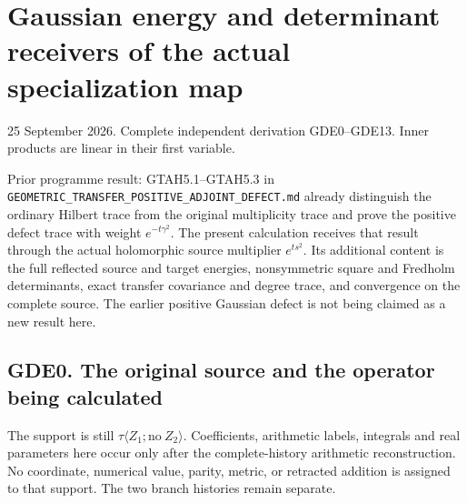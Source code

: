 \section{Gaussian energy and determinant receivers of the actual
specialization
map}\label{gaussian-energy-and-determinant-receivers-of-the-actual-specialization-map}

25 September 2026. Complete independent derivation GDE0--GDE13. Inner
products are linear in their first variable.

Prior programme result: GTAH5.1--GTAH5.3 in
\nolinkurl{GEOMETRIC_TRANSFER_POSITIVE_ADJOINT_DEFECT.md} already
distinguish the ordinary Hilbert trace from the original multiplicity
trace and prove the positive defect trace with weight
\(e^{-t\gamma^2}\). The present calculation receives that result through
the actual holomorphic source multiplier \(e^{ts^2}\). Its additional
content is the full reflected source and target energies, nonsymmetric
square and Fredholm determinants, exact transfer covariance and degree
trace, and convergence on the complete source. The earlier positive
Gaussian defect is not being claimed as a new result here.

\subsection{GDE0. The original source and the operator being
calculated}\label{gde0.-the-original-source-and-the-operator-being-calculated}

The support is still \(\tau\langle Z_1;\mathrm{no}\ Z_2\rangle\).
Coefficients, arithmetic labels, integrals and real parameters here
occur only after the complete-history arithmetic reconstruction. No
coordinate, numerical value, parity, metric, or retracted addition is
assigned to that support. The two branch histories remain separate.

